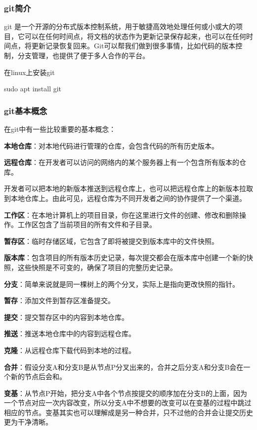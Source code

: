 \subsubsection{git简介}

git 是一个开源的分布式版本控制系统，用于敏捷高效地处理任何或小或大的项目，它可以在任何时间点，将文档的状态作为更新记录保存起来，也可以在任何时间点，将更新记录恢复回来。Git可以帮我们做到很多事情，比如代码的版本控制，分支管理，也提供了便于多人合作的平台。

在linux上安装git

\begin{tcode}
	sudo apt install git
\end{tcode}

\subsubsection{git基本概念}

在git中有一些比较重要的基本概念：

\textbf{本地仓库}：对本地代码进行管理的仓库，会包含代码的所有历史版本。

\textbf{远程仓库}：在开发者可以访问的网络内的某个服务器上有一个包含所有版本的仓库。

开发者可以把本地的新版本推送到远程仓库上，也可以把远程仓库上的新版本拉取到本地仓库上。由此可见，远程仓库为不同开发者之间的协作提供了一个渠道。

\textbf{工作区}：在本地计算机上的项目目录，你在这里进行文件的创建、修改和删除操作。工作区包含了当前项目的所有文件和子目录。

\textbf{暂存区}：临时存储区域，它包含了即将被提交到版本库中的文件快照。

\textbf{版本库}：包含项目的所有版本历史记录，每次提交都会在版本库中创建一个新的快照，这些快照是不可变的，确保了项目的完整历史记录。

\textbf{分支}：简单来说就是同一棵树上的两个分叉，实际上是指向更改快照的指针。

\textbf{暂存}：添加文件到暂存区准备提交。

\textbf{提交}：提交暂存区中的内容到本地仓库。

\textbf{推送}：推送本地仓库中的内容到远程仓库。

\textbf{克隆}：从远程仓库下载代码到本地的过程。

\textbf{合并}：假设分支A和分支B是从节点P分叉出来的，合并之后分支A和分支B会在一个新的节点后会和。

\textbf{变基}：从节点P开始，把分支A中各个节点按提交的顺序加在分支B的上面，因为一个节点对应一次内容改变，所以分支A中不想要的改变可以在变基的过程中跳过相应的节点。变基其实也可以理解成是另一种合并，只不过他的合并会让提交历史更为干净清晰。

